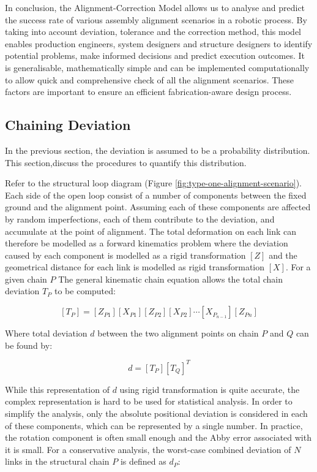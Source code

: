In conclusion, the Alignment-Correction Model allows us to analyse and predict the success rate of various assembly alignment scenarios in a robotic process. By taking into account deviation, tolerance and the correction method, this model enables production engineers, system designers and structure designers to identify potential problems, make informed decisions and predict execution outcomes. It is generalisable, mathematically simple and can be implemented computationally to allow quick and comprehensive check of all the alignment scenarios. These factors are important to ensure an efficient fabrication-aware design process.

\subsection{Chaining Deviation}
\label{subsection:new-hypo-model-chaining-deviation}

In the previous section, the deviation is assumed to be a probability distribution. This section,discuss the procedures to quantify this distribution.

Refer to the structural loop diagram (Figure \ref{fig:type-one-alignment-scenario}). Each side of the open loop consist of a number of components between the fixed ground and the alignment point. Assuming each of these components are affected by random imperfections, each of them contribute to the deviation, and accumulate at the point of alignment. The total deformation on each link can therefore be modelled as a forward kinematics problem where the deviation caused by each component is modelled as a rigid transformation $[Z]$ and the geometrical distance for each link is modelled as rigid transformation $[X]$. For a given chain $P$ The general kinematic chain equation allows the total chain deviation $T_P$ to be computed:

\begin{equation} \label{eq:one-chain-deviation}
    [T_P] = [Z_{P1}][X_{P1}][Z_{P2}][X_{P2}] \cdots [X_{P_{n-1}}][Z_{Pn}]
\end{equation}

Where total deviation $d$ between the two alignment points on chain $P$ and $Q$ can be found by:

\begin{equation} \label{eq:two-chain-deviation}
    d = [T_P][T_Q]^T
\end{equation}

While this representation of $d$ using rigid transformation is quite accurate, the complex representation is hard to be used for statistical analysis. In order to simplify the analysis, only the absolute positional deviation is considered in each of these components, which can be represented by a single number. In practice, the rotation component is often small enough and the Abby error associated with it is small. For a conservative analysis, the worst-case combined deviation of $N$ links in the structural chain $P$ is defined as $d_P$:

